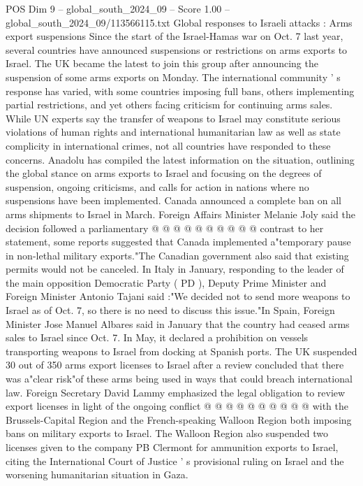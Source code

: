 \begin{textsample}{POS Dim 9 – global\_south\_2024\_09 – Score 1.00 – global\_south\_2024\_09/113566115.txt}  \label{ex:f9_pos_342}
Global responses to Israeli attacks : Arms export suspensions Since the start of the Israel-Hamas war on Oct. 7 last year, several countries have announced suspensions or restrictions on arms exports to Israel.
The UK became the latest to join this group after announcing the suspension of some arms exports on Monday.
The international community ' s response has varied, with some countries imposing full bans, others implementing partial restrictions, and yet others facing criticism for continuing arms sales.
While UN experts say the transfer of weapons to Israel may constitute serious violations of human rights and international humanitarian law as well as state complicity in international crimes, not all countries have responded to these concerns.
Anadolu has compiled the latest information on the situation, outlining the global stance on arms exports to Israel and focusing on the degrees of suspension, ongoing criticisms, and calls for action in nations where no suspensions have been implemented.
Canada announced a complete ban on all arms shipments to Israel in March.
Foreign Affairs Minister Melanie Joly said the decision followed a parliamentary @ @ @ @ @ @ @ @ @ @ contrast to her statement, some reports suggested that Canada implemented a"temporary pause in non-lethal military exports."The Canadian government also said that existing permits would not be canceled.
In Italy in January, responding to the leader of the main opposition Democratic Party ( PD ), Deputy Prime Minister and Foreign Minister Antonio Tajani said :"We decided not to send more weapons to Israel as of Oct. 7, so there is no need to discuss this issue."In Spain, Foreign Minister Jose Manuel Albares said in January that the country had ceased arms sales to Israel since Oct. 7.
In May, it declared a prohibition on vessels transporting weapons to Israel from docking at Spanish ports.
The UK suspended 30 out of 350 arms export licenses to Israel after a review concluded that there was a"clear risk"of these arms being used in ways that could breach international law.
Foreign Secretary David Lammy emphasized the legal obligation to review export licenses in light of the ongoing conflict @ @ @ @ @ @ @ @ @ @ with the Brussels-Capital Region and the French-speaking Walloon Region both imposing bans on military exports to Israel.
The Walloon Region also suspended two licenses given to the company PB Clermont for ammunition exports to Israel, citing the International Court of Justice ' s provisional ruling on Israel and the worsening humanitarian situation in Gaza.

\end{textsample}
